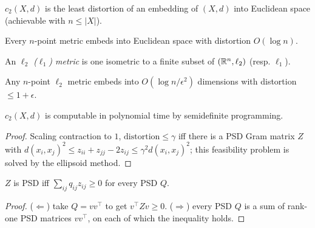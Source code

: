 \begin{definition}
  \label{def:c2}
  $c_2(X,d)$ is the least distortion of an embedding of $(X,d)$ into Euclidean
  space (achievable with $n\le|X|$).
\end{definition}

\begin{theorem}
  \label{thm:bourgain}
  \notready
  Every $n$-point metric embeds into Euclidean space with distortion $O(\log n)$.
\end{theorem}

\begin{definition}
  \label{def:lp-metric}
  An \emph{$\ell_2$ ($\ell_1$) metric} is one isometric to a finite subset of
  $(\mathbb{R}^n,\ell_2)$ (resp. $\ell_1$).
\end{definition}

\begin{theorem}
  \label{thm:jl}
  \notready
  Any $n$-point $\ell_2$ metric embeds into $O(\log n/\epsilon^2)$ dimensions
  with distortion $\le1+\epsilon$.
\end{theorem}

\begin{theorem}
  \label{thm:c2-computable}
  $c_2(X,d)$ is computable in polynomial time by semidefinite programming.
\end{theorem}
\begin{proof}
  Scaling contraction to $1$, $\mathrm{distortion}\le\gamma$ iff there is a PSD
  Gram matrix $Z$ with $d(x_i,x_j)^2\le z_{ii}+z_{jj}-2z_{ij}\le\gamma^2
  d(x_i,x_j)^2$; this feasibility problem is solved by the ellipsoid method.
\end{proof}

\begin{claim}
  \label{claim:psd-duality}
  $Z$ is PSD iff $\sum_{ij}q_{ij}z_{ij}\ge0$ for every PSD $Q$.
\end{claim}
\begin{proof}
  ($\Leftarrow$) take $Q=vv^\top$ to get $v^\top Zv\ge0$. ($\Rightarrow$) every
  PSD $Q$ is a sum of rank-one PSD matrices $vv^\top$, on each of which the
  inequality holds.
\end{proof}


